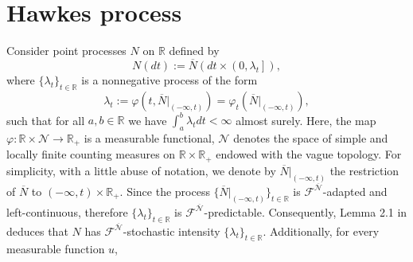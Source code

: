\documentclass[11pt]{article}
\numberwithin{equation}{section}
\begin{document}
\section{Hawkes process}
 Consider point processes $\mathit{N}$ on $\mathbb{R}$ defined by
\begin{equation*}
N(dt):=\overline{N}(dt\times\left(0,\lambda_t\right]),
\end{equation*}
where $\{\lambda_t\}_{t\in\mathbb{R}}$ is a nonnegative process of the form
\begin{equation*}
\lambda_t:=\varphi(t,\overline{N}\lvert_{\left(-\infty,t\right)})=\varphi_t(\overline{N}\lvert_{\left(-\infty,t\right)}),
\end{equation*}
such that for all $a,b\in\mathbb{R}$ we have $\int_{a}^{b}\lambda_t dt<\infty$ almost surely.
Here, the map $\varphi:\mathbb{R}\times\mathcal{N}\to\mathbb{R_{+}}$ is a measurable functional, $\mathcal{N}$ denotes the space of simple and locally finite counting measures on $\mathbb{R}\times\mathbb{R_{+}}$ endowed with the vague topology. For simplicity, with a little abuse of notation, we denote by $\overline{N}\lvert_{\left(-\infty,t\right)}$ the restriction of $\overline{\mathit{N}}$ to ${\left(-\infty,t\right)}\times\mathbb{R_{+}}$. 
Since the process $\{\overline{N}\lvert_{\left(-\infty,t\right)}\}_{t\in\mathbb{R}}$ is $\mathcal{F^{\overline{N}}}$-adapted and left-continuous, therefore
$\{\lambda_t\}_{t\in\mathbb{R}}$ is $\mathcal{F^{\overline{N}}}$-predictable. Consequently, Lemma 2.1 in \cite{torrisi} deduces that $N$ 
has $\mathcal{F^{\overline{N}}}$-stochastic intensity $\{\lambda_t\}_{t\in\mathbb{R}}$. Additionally, for every measurable function $u$, 
\end{document}
